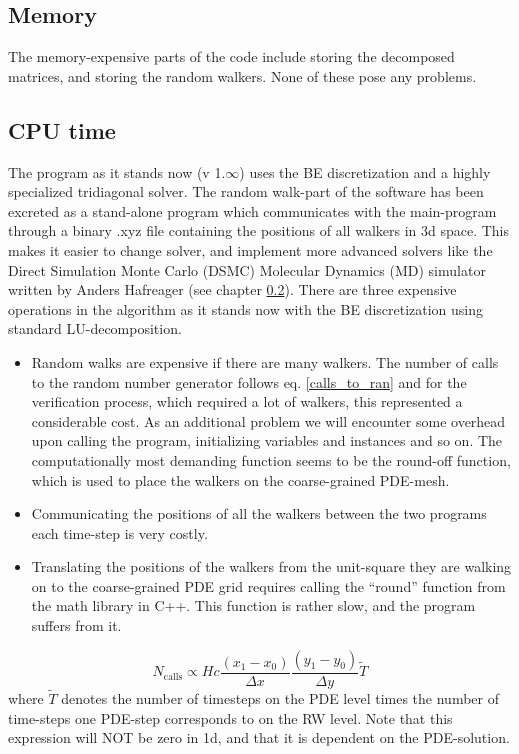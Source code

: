 \subsection{Memory}
The memory-expensive parts of the code include storing the decomposed matrices, and storing the random walkers. 
None of these pose any problems.

\subsection{CPU time}
The program as it stands now (v 1.$\infty$) uses the BE discretization and a highly specialized tridiagonal solver. 
The random walk-part of the software has been excreted as a stand-alone program which communicates with the main-program through a binary .xyz file containing the positions of all walkers in 3d space. This makes it easier to change solver, and implement more advanced solvers like the Direct Simulation Monte Carlo (DSMC) Molecular Dynamics (MD) simulator written by Anders Hafreager (see chapter \ref{}). 
There are three expensive operations in the algorithm as it stands now with the BE discretization using standard LU-decomposition.
\begin{itemize}
\item Random walks are expensive if there are many walkers. The number of calls to the random number generator follows eq. \ref{calls_to_ran} and for the verification process, which required a lot of walkers, this represented a considerable cost. 
As an additional problem we will encounter some overhead upon calling the program, initializing variables and instances and so on. 
The computationally most demanding function seems to be the round-off function, which is used to place the walkers on the coarse-grained PDE-mesh.
\item Communicating the positions of all the walkers between the two programs each time-step is very costly.
\item Translating the positions of the walkers from the unit-square they are walking on to the coarse-grained PDE grid requires calling the ``round'' function from the math library in C++. This function is rather slow, and the program suffers from it. 
\end{itemize}

\begin{equation}\label{calls_to_ran}
 N_{\text{calls}} \propto Hc\frac{(x_1-x_0)}{\Delta x}\frac{(y_1-y_0)}{\Delta y}\tilde{T}
\end{equation}
where $\tilde{T}$ denotes the number of timesteps on the PDE level times the number of time-steps one PDE-step corresponds to on the RW level. Note that this expression will NOT be zero in 1d, and that it is dependent on the PDE-solution.

